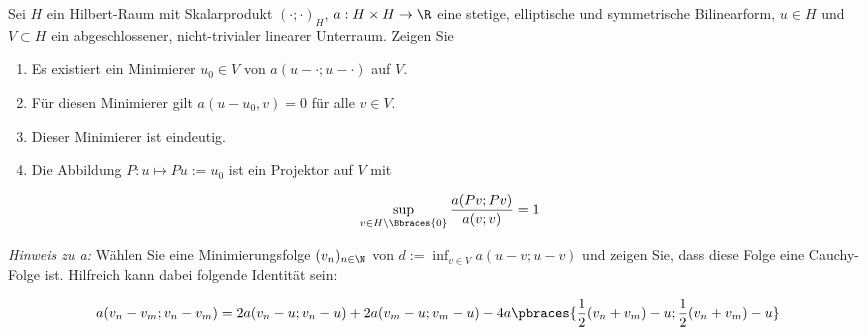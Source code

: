
\begin{exercise}

Sei $H$ ein Hilbert-Raum mit Skalarprodukt $(\cdot; \cdot)_H$, $a: H \times H \to \R$ eine stetige, elliptische und symmetrische Bilinearform, $u \in H$ und $V \subset H$ ein abgeschlossener, nicht-trivialer linearer Unterraum.
Zeigen Sie

\begin{enumerate}[label = \textbf{\alph*)}]

  \item Es existiert ein Minimierer $u_0 \in V$ von $a(u- \cdot; u- \cdot)$ auf $V$.

  \item Für diesen Minimierer gilt $a(u-u_0,v) = 0$ für alle $v \in V$.

  \item Dieser Minimierer ist eindeutig.

  \item Die Abbildung $P: u \mapsto Pu := u_0$ ist ein Projektor auf $V$ mit

  \begin{align}
    \sup_{v \in H \setminus \Bbraces{0}}
    \frac{a(Pv; Pv)}{a(v; v)} = 1
  \end{align}

\end{enumerate}

\textit{Hinweis zu a:}
Wählen Sie eine Minimierungsfolge $(v_n)_{n \in \N}$ von $d := \inf_{v \in V} a(u - v; u - v)$ und zeigen Sie, dass diese Folge eine Cauchy-Folge ist.
Hilfreich kann dabei folgende Identität sein:

\begin{align}
  a(v_n - v_m ; v_n - v_m)
  =
  2 a(v_n - u; v_n - u)
  +
  2 a(v_m - u; v_m - u) -
  4 a\pbraces
  {
    \frac{1}{2}(v_n + v_m) - u;
    \frac{1}{2}(v_n + v_m) - u
  }
\end{align}

\end{exercise}


